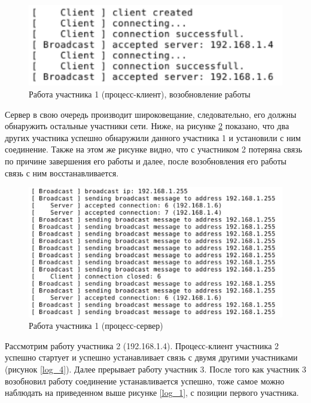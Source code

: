 \begin{figure}[!hbt]
    \centering
    \includegraphics{log_2}
    \caption{Работа участника 1 (процесс-клиент), возобновление работы}\label{log_2}
\end{figure}
\newpar
Сервер в свою очередь производит широковещание, следовательно, его должны
обнаружить остальные участники сети. Ниже, на рисунке \ref{log_3} показано, что два
других участника успешно обнаружили данного участника 1 и установили с
ним соединение. Также на этом же рисунке видно, что с участником 2 потеряна
связь по причине завершения его работы и далее, после возобновления его
работы связь с ним восстанавливается.

\begin{figure}[!hbt]
    \centering
    \includegraphics[width=\textwidth]{log_3}
    \caption{Работа участника 1 (процесс-сервер)}\label{log_3}
\end{figure}
\newpar
Рассмотрим работу участника 2 (192.168.1.4). Процесс-клиент участника 2
успешно стартует и успешно устанавливает связь с двумя другими
участниками (рисунок \ref{log_4}). Далее прерывает работу участник 3. После того
как участник 3 возобновил работу соединение устанавливается успешно,
тоже самое можно наблюдать на приведенном выше рисунке \ref{log_1}, с позиции
первого участника.

